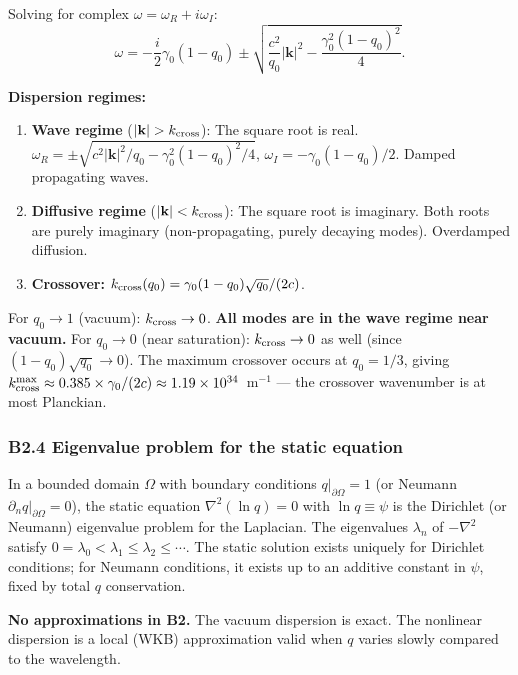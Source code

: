 \documentclass[reprint]{revtex4-2}
\begin{document}
Solving for complex $\omega = \omega_R + i\omega_I$:
\begin{equation}
\omega = -\frac{i}{2}\gamma_0(1-q_0) \pm \sqrt{\frac{c^2}{q_0}|\mathbf{k}|^2 - \frac{\gamma_0^2(1-q_0)^2}{4}}.
\label{eq:nonlinear_dispersion}
\end{equation}

\textbf{Dispersion regimes:}
\begin{enumerate}[label=(\roman*)]
\item \textbf{Wave regime} ($|\mathbf{k}| > k_{\rm cross}$): The square root is real. $\omega_R = \pm\sqrt{c^2|\mathbf{k}|^2/q_0 - \gamma_0^2(1-q_0)^2/4}$, $\omega_I = -\gamma_0(1-q_0)/2$. Damped propagating waves.
\item \textbf{Diffusive regime} ($|\mathbf{k}| < k_{\rm cross}$): The square root is imaginary. Both roots are purely imaginary (non-propagating, purely decaying modes). Overdamped diffusion.
\item \textbf{Crossover:} $k_{\rm cross}(q_0) = \gamma_0(1-q_0)\sqrt{q_0}/(2c)$.
\end{enumerate}

For $q_0\to 1$ (vacuum): $k_{\rm cross} \to 0$. \textbf{All modes are in the wave regime near vacuum.} For $q_0\to 0$ (near saturation): $k_{\rm cross} \to 0$ as well (since $(1-q_0)\sqrt{q_0} \to 0$). The maximum crossover occurs at $q_0 = 1/3$, giving $k_{\rm cross}^{\max} \approx 0.385 \times \gamma_0/(2c) \approx 1.19\times 10^{34}$~m$^{-1}$ --- the crossover wavenumber is at most Planckian.

\subsubsection{B2.4 Eigenvalue problem for the static equation}

In a bounded domain $\Omega$ with boundary conditions $q|_{\partial\Omega}=1$ (or Neumann $\partial_n q|_{\partial\Omega}=0$), the static equation $\nabla^2(\ln q)=0$ with $\ln q\equiv\psi$ is the Dirichlet (or Neumann) eigenvalue problem for the Laplacian. The eigenvalues $\lambda_n$ of $-\nabla^2$ satisfy $0=\lambda_0<\lambda_1\le\lambda_2\le\cdots$. The static solution exists uniquely for Dirichlet conditions; for Neumann conditions, it exists up to an additive constant in $\psi$, fixed by total $q$ conservation.

\textbf{No approximations in B2.} The vacuum dispersion is exact. The nonlinear dispersion is a local (WKB) approximation valid when $q$ varies slowly compared to the wavelength.
\end{document}
